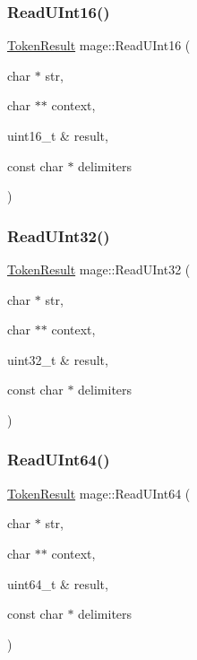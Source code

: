\hypertarget{namespacemage_a8e94422a0e962b98b2555bc95c6eff4c}{}\label{namespacemage_a8e94422a0e962b98b2555bc95c6eff4c} 
\subsubsection{\texorpdfstring{Read\+U\+Int16()}{ReadUInt16()}}
{\footnotesize\ttfamily \hyperlink{namespacemage_a2178ba2411db5912f41b2e7698c2037d}{Token\+Result} mage\+::\+Read\+U\+Int16 (\begin{DoxyParamCaption}\item[{char $\ast$}]{str,  }\item[{char $\ast$$\ast$}]{context,  }\item[{uint16\+\_\+t \&}]{result,  }\item[{const char $\ast$}]{delimiters }\end{DoxyParamCaption})}

\hypertarget{namespacemage_aaa46d4e55d14328f2c97ffbcd9167727}{}\label{namespacemage_aaa46d4e55d14328f2c97ffbcd9167727} 
\subsubsection{\texorpdfstring{Read\+U\+Int32()}{ReadUInt32()}}
{\footnotesize\ttfamily \hyperlink{namespacemage_a2178ba2411db5912f41b2e7698c2037d}{Token\+Result} mage\+::\+Read\+U\+Int32 (\begin{DoxyParamCaption}\item[{char $\ast$}]{str,  }\item[{char $\ast$$\ast$}]{context,  }\item[{uint32\+\_\+t \&}]{result,  }\item[{const char $\ast$}]{delimiters }\end{DoxyParamCaption})}

\hypertarget{namespacemage_a87be513083fe421ab93f3007538ebef6}{}\label{namespacemage_a87be513083fe421ab93f3007538ebef6} 
\subsubsection{\texorpdfstring{Read\+U\+Int64()}{ReadUInt64()}}
{\footnotesize\ttfamily \hyperlink{namespacemage_a2178ba2411db5912f41b2e7698c2037d}{Token\+Result} mage\+::\+Read\+U\+Int64 (\begin{DoxyParamCaption}\item[{char $\ast$}]{str,  }\item[{char $\ast$$\ast$}]{context,  }\item[{uint64\+\_\+t \&}]{result,  }\item[{const char $\ast$}]{delimiters }\end{DoxyParamCaption})}

